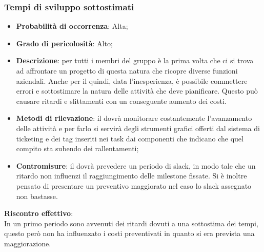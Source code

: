 		\subsubsection{Tempi di sviluppo sottostimati} %
		\label{ssub:tempi_di_sviluppo_sottostimati}
			\begin{itemize}
				\item \textbf{Probabilità di occorrenza}: Alta;
				\item \textbf{Grado di pericolosità}: Alto;
				\item \textbf{Descrizione}: per tutti i membri del gruppo è la prima volta che ci si trova ad affrontare un progetto di questa natura che ricopre diverse funzioni aziendali. Anche per il \roleProjectManager{} quindi, data l'inesperienza, è possibile commettere errori e sottostimare la natura delle attività che deve pianificare. Questo può causare ritardi e slittamenti con un conseguente aumento dei costi.
				\item \textbf{Metodi di rilevazione}: il \roleProjectManager{} dovrà monitorare costantemente l'avanzamento delle attività e per farlo si servirà degli strumenti grafici offerti dal sistema di ticketing e dei tag inseriti nei task dai componenti che indicano che quel compito sta subendo dei rallentamenti;
				\item \textbf{Contromisure}: il \roleProjectManager{} dovrà prevedere un periodo di slack, in modo tale che un ritardo non influenzi il raggiungimento delle milestone fissate. Si è inoltre pensato di presentare un preventivo maggiorato nel caso lo slack assegnato non bastasse.
			\end{itemize}
		\noindent
		\textbf{Riscontro effettivo}: \\
		In un primo periodo sono avvenuti dei ritardi dovuti a una sottostima dei tempi, questo però non ha influenzato i costi preventivati in quanto si era prevista una maggiorazione. 
		
